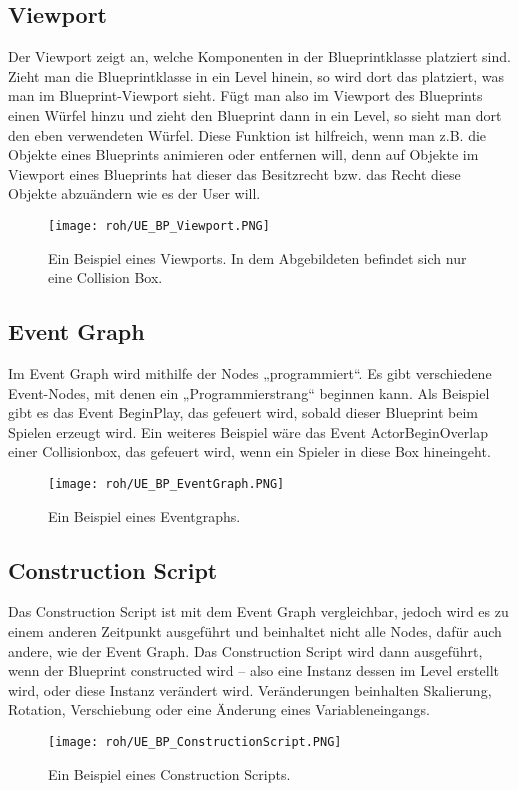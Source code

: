 \subsection{Viewport}
Der Viewport zeigt an, welche Komponenten in der Blueprintklasse platziert sind.
Zieht man die Blueprintklasse in ein Level hinein, so wird dort das platziert, was man im Blueprint-Viewport sieht.\citep{ue:BPViewport}
Fügt man also im Viewport des Blueprints einen Würfel hinzu und zieht den Blueprint dann in ein Level, so sieht man dort den eben verwendeten Würfel.
Diese Funktion ist hilfreich, wenn man z.B. die Objekte eines Blueprints animieren oder entfernen will, denn auf Objekte im Viewport eines Blueprints hat dieser das Besitzrecht bzw. das Recht diese Objekte abzuändern wie es der User will.
\begin{figure}[H]
    \centering
    \texttt{[image: roh/UE\_BP\_Viewport.PNG]}
    \caption{Ein Beispiel eines Viewports. In dem Abgebildeten befindet sich nur eine Collision Box.}
    \label{UE:BP_Viewport}
\end{figure}
\subsection{Event Graph}
Im Event Graph wird mithilfe der Nodes „programmiert“.\citep{ue:BPEventGraph}
Es gibt verschiedene Event-Nodes, mit denen ein „Programmierstrang“ beginnen kann.
Als Beispiel gibt es das Event BeginPlay, das gefeuert wird, sobald dieser Blueprint beim Spielen erzeugt wird.
Ein weiteres Beispiel wäre das Event ActorBeginOverlap einer Collisionbox, das gefeuert wird, wenn ein Spieler in diese Box hineingeht.
\begin{figure}[H]
    \centering
    \texttt{[image: roh/UE\_BP\_EventGraph.PNG]}
    \caption{Ein Beispiel eines Eventgraphs.}
    \label{UE:BP_EventGraph}
\end{figure}
\subsection{Construction Script}
Das Construction Script ist mit dem Event Graph vergleichbar, jedoch wird es zu einem anderen Zeitpunkt ausgeführt und beinhaltet nicht alle Nodes, dafür auch andere, wie der Event Graph.\citep{ue:BPConScript}
Das Construction Script wird dann ausgeführt, wenn der Blueprint constructed wird – also eine Instanz dessen im Level erstellt wird, oder diese Instanz verändert wird.
Veränderungen beinhalten Skalierung, Rotation, Verschiebung oder eine Änderung eines Variableneingangs.
\begin{figure}[H]
    \centering
    \texttt{[image: roh/UE\_BP\_ConstructionScript.PNG]}
    \caption{Ein Beispiel eines Construction Scripts.}
    \label{UE:BP_ConstructionScript}
\end{figure}

